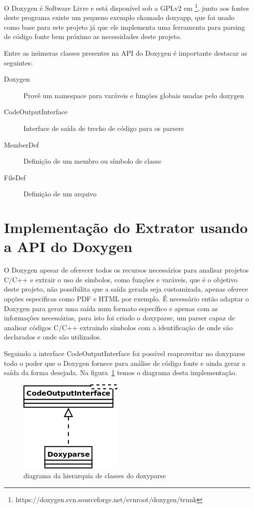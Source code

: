 O Doxygen é Software Livre e está disponível sob a GPLv2 em
\footnote{https://doxygen.svn.sourceforge.net/svnroot/doxygen/trunk}, junto aos
fontes deste programa existe um pequeno exemplo chamado doxyapp, que foi usado
como base para este projeto já que ele implementa uma ferramenta para parsing
de código fonte bem próximo as necessidades deste projeto.

Entre as inúmeras classes presentes na API do Doxygen é importante
destacar as seguintes:

\begin{description}
\item[Doxygen] Provê um namespace para varáveis e funções globais usadas pelo doxygen
\item[CodeOutputInterface] Interface de saída de trecho de código para os parsers
\item[MemberDef] Definição de um membro ou símbolo de classe
\item[FileDef] Definição de um arquivo
\end{description}

\section{Implementação do Extrator usando a API do Doxygen}

O Doxygen apesar de oferecer todos os recursos necessários para
analisar projetos C/C++ e extrair o uso de símbolos, como funções e varáveis,
que é o objetivo deste projeto, não possibilita que a saída gerada seja
customizada, apenas oferece opções específicas como PDF e HTML por exemplo. É
necessário então adaptar o Doxygen para gerar uma saída num formato
específico e apenas com as informações necessárias, para isto foi criado o
doxyparse, um parser capaz de analisar códigos C/C++ extraindo símbolos
com a identificação de onde são declarados e onde são utilizados.

Seguindo a interface CodeOutputInterface foi possível reaproveitar no doxyparse
todo o poder que o Doxygen fornece para análise de código fonte e ainda gerar a
saída da forma desejada. Na figura~\ref{doxyparse-diagram} temos o diagrama
desta implementação.

\begin{figure}[h]
\center
\includegraphics[scale=0.5]{imagens/doxyparse-diagram}
\caption{diagrama da hierarquia de classes do doxyparse}
\label{doxyparse-diagram}
\end{figure}

